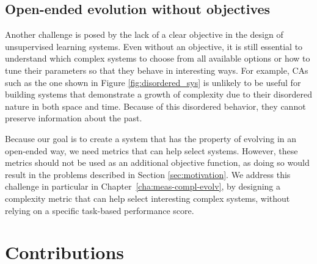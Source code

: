 \subsection{Open-ended evolution without
  objectives}\label{sec:open-ended-evolution}

Another challenge is posed by the lack of a clear objective in the design of
unsupervised learning systems. Even without an objective, it is still essential
to understand which complex systems to choose from all available options or how
to tune their parameters so that they behave in interesting ways. For example,
\acp{CA} such as the one shown in Figure \ref{fig:disordered_sys} is unlikely 
to be useful for building systems that demonstrate a growth of complexity 
due to their disordered nature in both space and time. Because of this disordered behavior, they cannot
preserve information about the past.

Because our goal is to create a system that has the property of evolving in an
open-ended way, we need metrics that can help select systems. However, these metrics 
should not be used as an additional objective function, as doing so would result 
in the problems described in Section \ref{sec:motivation}. We address this 
challenge in particular
in Chapter~\ref{cha:meas-compl-evolv}, by designing a complexity metric that can
help select interesting complex systems, without relying on a specific
task-based performance score.

\section{Contributions}

